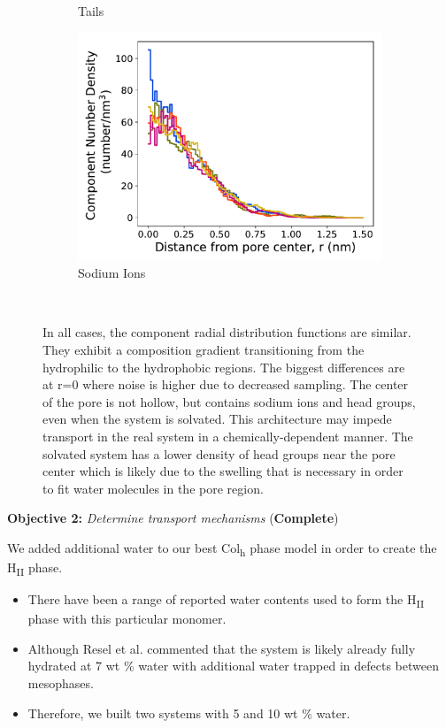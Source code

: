 \documentclass{article}
\begin{document}
\begin{figure}[!htb]
\begin{subfigure}{0.32\textwidth}
        \caption{Tails}
        \label{fig:tails_regional_density}
  \end{subfigure}
  \begin{subfigure}{0.32\textwidth}
        \includegraphics[width=1\linewidth]{sodium_density.pdf}
        \caption{Sodium Ions}
        \label{fig:sodium_regional_density}
  \end{subfigure}
  \caption{In all cases, the component radial distribution functions are similar.
      They exhibit a composition gradient transitioning from the hydrophilic to the hydrophobic
          regions. The biggest differences are at r=0 where noise is higher due to
          decreased sampling. The center of the pore is not hollow, but contains sodium ions and
          head groups, even when the system is solvated. This architecture may impede transport in
          the real system in a chemically-dependent manner.
          The solvated system has a lower density of head groups near the
          pore center which is likely due to the swelling that is necessary in order to fit water
          molecules in the pore region.}~\label{fig:overlaid_densities}
  \end{figure}
  
  \noindent \textbf{\large Objective 2:} \textit{\large Determine transport mechanisms} (\textcolor{green!40!olive}{\textbf{Complete}})
  
  \noindent We added additional water to our best Col\textsubscript{h} 
  phase model in order to create the H\textsubscript{II} phase.
  \begin{itemize}
    \item There have been a range of reported water contents used to 
    form the H\textsubscript{II} phase with this particular monomer.
    \item Although Resel et al. commented that the system is likely
    already fully hydrated at 7 wt \% water with additional water
    trapped in defects between mesophases.
    \item Therefore, we built two systems with 5 and 10 wt \% water.
  \end{itemize}
  
\end{document}
